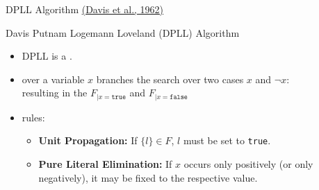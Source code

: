 \documentclass[t]{sdqbeamer}
\begin{document}
\begin{frame}{DPLL Algorithm \href{http://doi.acm.org/10.1145/368273.368557}{(Davis et al., 1962)}}
	
	\begin{block}{Davis Putnam Logemann Loveland (DPLL) Algorithm}
		\begin{itemize}\setlength{\itemsep}{1em}
			\item DPLL is a .
			\item {} over a variable $x$ branches the search over two cases $x$ and $\lnot x$:\\
			resulting in the  $F_{|x=\texttt{true}}$ and $F_{|x=\texttt{false}}$
			\item {} rules:
			\begin{itemize}\setlength{\itemsep}{1ex}
				\item \textbf{Unit Propagation:}
				If $\{ l \} \in F$, $l$ must be set to \texttt{true}.
				\item  \textbf{Pure Literal Elimination:} If $x$ occurs only positively (or only negatively), it may be fixed to the respective value.
			\end{itemize}
		\end{itemize}
	\end{block}
\end{frame}
\end{document}
